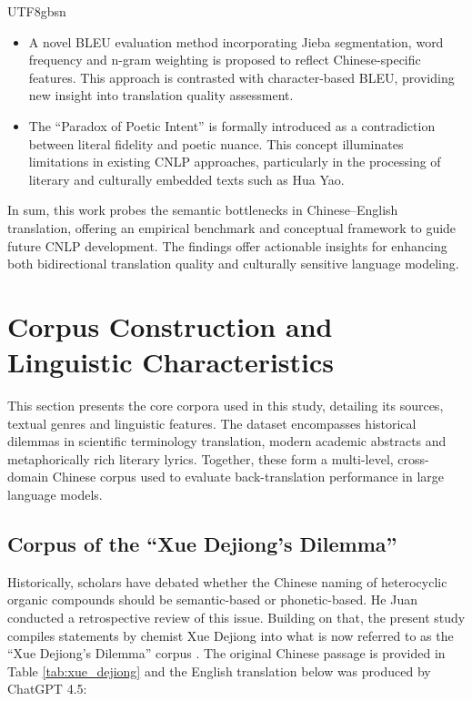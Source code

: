\documentclass[conference]{IEEEtran}
\begin{document}
\begin{CJK}{UTF8}{gbsn}
\begin{itemize}
\item A novel BLEU evaluation method incorporating Jieba segmentation, word frequency and n-gram weighting is proposed to reflect Chinese-specific features. This approach is contrasted with character-based BLEU, providing new insight into translation quality assessment.

\item The ``Paradox of Poetic Intent'' is formally introduced as a contradiction between literal fidelity and poetic nuance. This concept illuminates limitations in existing CNLP approaches, particularly in the processing of literary and culturally embedded texts such as Hua Yao.
\end{itemize}

In sum, this work probes the semantic bottlenecks in Chinese–English translation, offering an empirical benchmark and conceptual framework to guide future CNLP development. The findings offer actionable insights for enhancing both bidirectional translation quality and culturally sensitive language modeling.




\section{Corpus Construction and Linguistic Characteristics}
\label{corpus}

This section presents the core corpora used in this study, detailing its sources, textual genres and linguistic features. The dataset encompasses historical dilemmas in scientific terminology translation, modern academic abstracts and metaphorically rich literary lyrics. Together, these form a multi-level, cross-domain Chinese corpus used to evaluate back-translation performance in large language models.

\subsection{Corpus of the ``Xue Dejiong’s Dilemma''}

Historically, scholars have debated whether the Chinese naming of heterocyclic organic compounds should be semantic-based or phonetic-based. He Juan \citep{hejuan2019nomencl} conducted a retrospective review of this issue. Building on that, the present study compiles statements by chemist Xue Dejiong into what is now referred to as the ``Xue Dejiong’s Dilemma'' corpus \citep{weigang2025xdj}. The original Chinese passage is provided in Table \ref{tab:xue_dejiong} and the English translation below was produced by ChatGPT 4.5:


\end{CJK}
\end{document}
